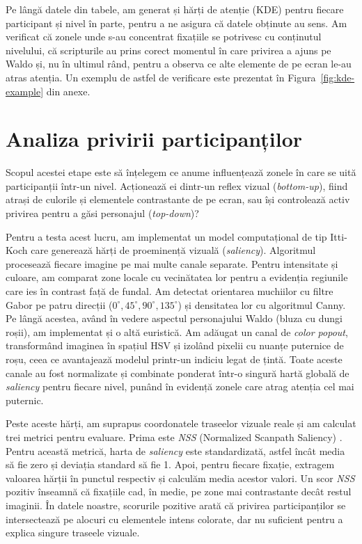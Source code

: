 Pe lângă datele din tabele, am generat și hărți de atenție (KDE) pentru fiecare participant și nivel în parte, pentru a ne asigura că datele obținute au sens. Am verificat că zonele unde s-au concentrat fixațiile se potrivesc cu conținutul nivelului, că scripturile au prins corect momentul în care privirea a ajuns pe Waldo și, nu în ultimul rând, pentru a observa ce alte elemente de pe ecran le-au atras atenția.
Un exemplu de astfel de verificare este prezentat în Figura~\ref{fig:kde-example} din anexe.


\section{Analiza privirii participanților}

Scopul acestei etape este să înțelegem ce anume influențează zonele în care se uită participanții într-un nivel. Acționează ei dintr-un reflex vizual (\emph{bottom-up}), fiind atrași de culorile și elementele contrastante de pe ecran, sau își controlează activ privirea pentru a găsi personajul (\emph{top-down})? 

Pentru a testa acest lucru, am implementat un model computațional de tip Itti-Koch \cite{itti1998} care generează hărți de proeminență vizuală (\emph{saliency}). Algoritmul procesează fiecare imagine pe mai multe canale separate. Pentru intensitate și culoare, am comparat zone locale cu vecinătatea lor pentru a evidenția regiunile care ies în contrast față de fundal. Am detectat orientarea muchiilor cu filtre Gabor pe patru direcții ($0^\circ, 45^\circ, 90^\circ, 135^\circ$) și densitatea lor cu algoritmul Canny. Pe lângă acestea, având în vedere aspectul personajului Waldo (bluza cu dungi roșii), am implementat și o altă euristică. Am adăugat un canal de \emph{color popout}, transformând imaginea în spațiul HSV și izolând pixelii cu nuanțe puternice de roșu, ceea ce avantajează modelul printr-un indiciu legat de țintă. Toate aceste canale au fost normalizate și combinate ponderat într-o singură hartă globală de \emph{saliency} pentru fiecare nivel, punând în evidență zonele care atrag atenția cel mai puternic.

Peste aceste hărți, am suprapus coordonatele traseelor vizuale reale și am calculat trei metrici pentru evaluare. Prima este \emph{NSS} (Normalized Scanpath Saliency) \cite{bylinskii2019metrics}. Pentru această metrică, harta de \emph{saliency} este standardizată, astfel încât media să fie zero și deviația standard să fie 1. Apoi, pentru fiecare fixație, extragem valoarea hărții în punctul respectiv și calculăm media acestor valori. Un scor \emph{NSS} pozitiv înseamnă că fixațiile cad, în medie, pe zone mai contrastante decât restul imaginii. În datele noastre, scorurile pozitive arată că privirea participanților se intersectează pe alocuri cu elementele intens colorate, dar nu suficient pentru a explica singure traseele vizuale.

